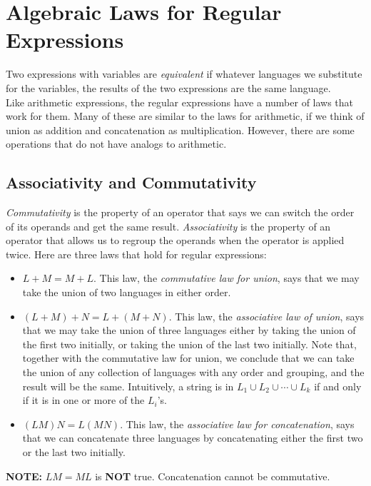 \documentclass[]{article}
\begin{document}
\section*{Algebraic Laws for Regular Expressions}
  Two expressions with variables are \emph{equivalent} if whatever languages we
  substitute for the variables, the results of the two expressions are the same
  language. \\
  \indent Like arithmetic expressions, the regular expressions have a number of
  laws that work for them. Many of these are similar to the laws for arithmetic,
  if we think of union as addition and concatenation as multiplication. However,
  there are some operations that do not have analogs to arithmetic.

  \subsection*{Associativity and Commutativity}
    \emph{Commutativity} is the property of an operator that says we can switch
    the order of its operands and get the same result. \emph{Associativity} is
    the property of an operator that allows us to regroup the operands when the
    operator is applied twice. Here are three laws that hold for regular
    expressions:
      \begin{itemize}
        \item $L + M = M + L$. This law, the \emph{commutative law for union},
        says that we may take the union of two languages in either order.
        \item $(L + M) + N = L + (M + N).$ This law, the \emph{associative law
        of union}, says that we may take the union of three languages either by
        taking the union of the first two initially, or taking the union of the
        last two initially. Note that, together with the commutative law for
        union, we conclude that we can take the union of any collection of
        languages with any order and grouping, and the result will be the same.
        Intuitively, a string is in $L_1 \cup L_2 \cup \cdots \cup L_k$ if and
        only if it is in one or more of the $L_i$'s.
        \item $(LM)N = L(MN)$. This law, the \emph{associative law for
        concatenation}, says that we can concatenate three languages by
        concatenating either the first two or the last two initially.
      \end{itemize}
    \textbf{NOTE:} $LM = ML$ is \textbf{NOT} true. Concatenation cannot be
    commutative.
\end{document}
